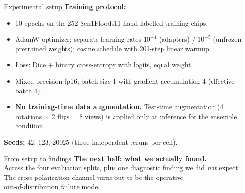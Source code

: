 \documentclass[aspectratio=169,11pt]{beamer}
\begin{document}
\begin{frame}{Experimental setup}
\textbf{Training protocol:}
\begin{itemize}
    \item 10 epochs on the 252 Sen1Floods11 hand-labelled training chips.
    \item AdamW optimizer; separate learning rates $10^{-4}$ (adapters) / $10^{-5}$ (unfrozen pretrained weights); cosine schedule with 200-step linear warmup.
    \item Loss: Dice + binary cross-entropy with logits, equal weight.
    \item Mixed-precision fp16; batch size 1 with gradient accumulation 4 (effective batch 4).
    \item \textbf{No training-time data augmentation.} Test-time augmentation (4 rotations $\times$ 2 flips = 8 views) is applied only at inference for the ensemble condition.
\end{itemize}
\vspace{0.4em}
\textbf{Seeds:} 42, 123, 20025 (three independent reruns per cell).
\end{frame}

\begin{frame}{From setup to findings}
\centering
\vspace{0.4em}
\textbf{\large The next half: what we actually found.}\\[1em]
Across the four evaluation splits, plus one diagnostic finding we did \emph{not} expect:\\[1.2em]
\textcolor{warn}{\large The cross-polarization channel turns out to be the operative\\out-of-distribution failure mode.}
\end{frame}

\end{document}
